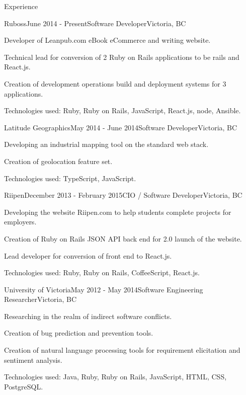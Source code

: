 \documentclass{resume} %
\begin{document}
\begin{rSection}{Experience}

\begin{rSubsection}{Ruboss}{June 2014 - Present}{Software Developer}{Victoria, BC}
\item Developer of Leanpub.com eBook eCommerce and writing website.
\item Technical lead for conversion of 2 Ruby on Rails applications to be rails and React.js.
\item Creation of development operations build and deployment systems for 3 applications.
\item Technologies used: Ruby, Ruby on Rails, JavaScript, React.js, node, Ansible.
\end{rSubsection}


\begin{rSubsection}{Latitude Geographics}{May 2014 - June 2014}{Software Developer}{Victoria, BC}
\item Developing an industrial mapping tool on the standard web stack.
\item Creation of geolocation feature set.
\item Technologies used: TypeScript, JavaScript.
\end{rSubsection}


\begin{rSubsection}{Riipen}{December 2013 - February 2015}{CIO / Software Developer}{Victoria, BC}
\item Developing the website Riipen.com to help students complete projects for employers.
\item Creation of Ruby on Rails JSON API back end for 2.0 launch of the website.
\item Lead developer for conversion of front end to React.js.
\item Technologies used: Ruby, Ruby on Rails, CoffeeScript, React.js.
\end{rSubsection}


\begin{rSubsection}{University of Victoria}{May 2012 - May 2014}{Software Engineering Researcher}{Victoria, BC}
\item Researching in the realm of indirect software conflicts.
\item Creation of bug prediction and prevention tools.
\item Creation of natural language processing tools for requirement elicitation and sentiment analysis.
\item Technologies used: Java, Ruby, Ruby on Rails, JavaScript, HTML, CSS, PostgreSQL.
\end{rSubsection}


\end{rSection}
\end{document}

